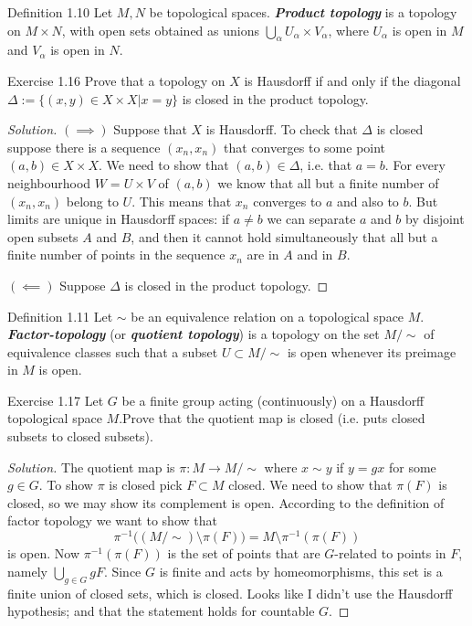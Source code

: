 \begin{thing3}{Definition 1.10}\leavevmode
	Let $M,N$ be topological spaces. \textit{\textbf{Product topology}} is a topology on $M \times N$, with open sets obtained as unions $\bigcup_{\alpha} U_\alpha \times V_\alpha$, where $U_\alpha$ is open in $M$ and $V_\alpha$ is open in $N$.
\end{thing3}

\begin{thing4}{Exercise 1.16}\leavevmode
	Prove that a topology on $X$ is Hausdorff if and only if the diagonal $\Delta:=\{(x,y) \in X \times X|x=y\}$ is closed in the product topology.
\end{thing4}

\begin{proof}[Solution]\leavevmode
$(\implies )$ Suppose that $X$ is Hausdorff. To check that $\Delta$ is closed suppose there is a sequence $(x_n,x_n)$ that converges to some point $(a,b) \in X \times X$. We need to show that $(a,b) \in \Delta$, i.e. that $a=b$. For every neighbourhood $W=U \times V$ of $(a,b)$ we know that all but a finite number of $(x_n,x_n)$ belong to $U$. This means that $x_n$ converges to  $a$ and also to  $b$. But limits are unique in Hausdorff spaces: if $a \neq b$ we can separate $a$ and  $b$ by disjoint open subsets $A$ and  $B$, and then it cannot hold simultaneously that all but a finite number of points in the sequence $x_n$ are in $A$ and in $B$.

$(\impliedby)$ Suppose $\Delta$ is closed in the product topology.
\end{proof}

\begin{thing3}{Definition 1.11}\leavevmode
	Let $\sim$ be an equivalence relation on a topological space $M$. \textit{\textbf{Factor-topology}} (or \textit{\textbf{quotient topology}}) is a topology on the set $M/\sim$ of equivalence classes such that a subset $U \subset M/\sim$ is open whenever its preimage in $M$ is open.
\end{thing3}

\begin{thing4}{Exercise 1.17}\label{exer:1.17}\leavevmode
	Let $G$ be a finite group acting (continuously) on a Hausdorff topological space $M$.Prove that the quotient map is closed (i.e. puts closed subsets to closed subsets).
\end{thing4}

\begin{proof}[Solution]\leavevmode
The quotient map is $\pi:M\to M/\sim$ where $x \sim y$ if $y=gx$ for some  $g \in G$. To show $\pi$ is closed pick $F \subset M$ closed. We need to show that $\pi(F)$ is closed, so we may show its complement is open. According to the definition of factor topology we want to show that
\[\pi^{-1}\Big((M/\sim) \setminus \pi(F)\Big)=M\setminus\pi^{-1}(\pi(F))\]
is open. Now $\pi^{-1}(\pi(F))$ is the set of points that are $G$-related to points in  $F$, namely $\bigcup_{g \in G} gF$. Since $G$ is finite and  acts by homeomorphisms, this set is a finite union of closed sets, which is closed. {\color{2}Looks like I didn't use the Hausdorff hypothesis; and that the statement holds for countable $G$.}
\end{proof}

